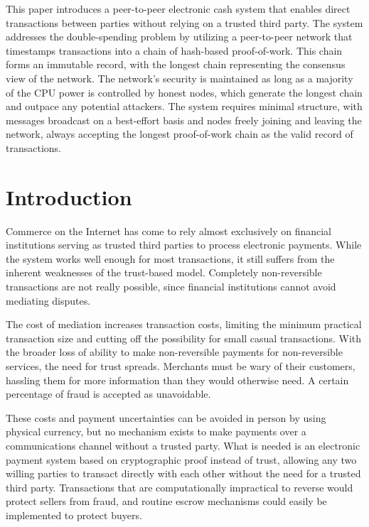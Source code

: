 \documentclass{article}
\begin{document}
This paper introduces a peer-to-peer electronic cash system that enables direct transactions between parties without relying on a trusted third party. The system addresses the double-spending problem by utilizing a peer-to-peer network that timestamps transactions into a chain of hash-based proof-of-work. This chain forms an immutable record, with the longest chain representing the consensus view of the network. The network's security is maintained as long as a majority of the CPU power is controlled by honest nodes, which generate the longest chain and outpace any potential attackers. The system requires minimal structure, with messages broadcast on a best-effort basis and nodes freely joining and leaving the network, always accepting the longest proof-of-work chain as the valid record of transactions.

\section{Introduction}

Commerce on the Internet has come to rely almost exclusively on financial institutions serving as trusted third parties to process electronic payments. While the system works well enough for most transactions, it still suffers from the inherent weaknesses of the trust-based model. Completely non-reversible transactions are not really possible, since financial institutions cannot avoid mediating disputes.

The cost of mediation increases transaction costs, limiting the minimum practical transaction size and cutting off the possibility for small casual transactions. With the broader loss of ability to make non-reversible payments for non-reversible services, the need for trust spreads. Merchants must be wary of their customers, hassling them for more information than they would otherwise need. A certain percentage of fraud is accepted as unavoidable.

These costs and payment uncertainties can be avoided in person by using physical currency, but no mechanism exists to make payments over a communications channel without a trusted party. What is needed is an electronic payment system based on cryptographic proof instead of trust, allowing any two willing parties to transact directly with each other without the need for a trusted third party. Transactions that are computationally impractical to reverse would protect sellers from fraud, and routine escrow mechanisms could easily be implemented to protect buyers.
\end{document}
